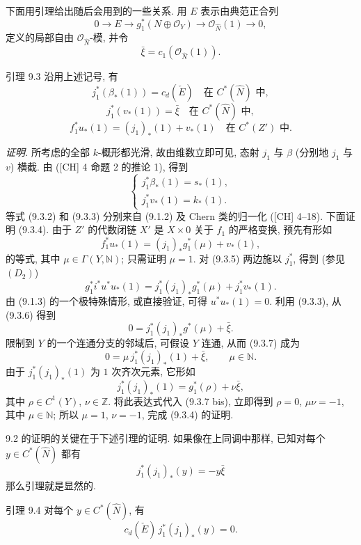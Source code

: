下面用引理给出随后会用到的一些关系. 用 $E$ 表示由典范正合列
\[
0\to E\to g_1^*(N\oplus\mathcal O_Y)\to\mathcal O_{\widehat N}(1)\to0,
\tag{9.3.0}
\]
定义的局部自由 $\mathcal O_{\widehat N}$-模, 并令
\[
\bar\xi=c_1(\mathcal O_{\widehat N}(1)).
\tag{9.3.1}
\]

\begin{statement}{引理 9.3}
沿用上述记号, 有
\[
j_1^*(\beta_*(1))=c_d(\check E)\quad\text{在 }C^*(\widehat N)\text{ 中},
\tag{9.3.2}
\]
\[
j_1^*(v_*(1))=\bar\xi\quad\text{在 }C^*(\widehat N)\text{ 中},
\tag{9.3.3}
\]
\[
f_1^*u_*(1)=(j_1)_*(1)+v_*(1)\quad\text{在 }C^*(Z')\text{ 中}.
\tag{9.3.4}
\]
\end{statement}

\emph{证明.} 所考虑的全部 $k$-概形都光滑, 故由维数立即可见, 态射 $j_1$ 与 $\beta$ (分别地 $j_1$ 与 $v$) 横截. 由 ([CH] 4 命题 2 的推论 1), 得到
\[
\begin{cases}
j_1^*\beta_*(1)=s_*(1),\\
j_1^*v_*(1)=k_*(1).
\end{cases}
\]
等式 (9.3.2) 和 (9.3.3) 分别来自 (9.1.2) 及 Chern 类的归一化 ([CH] 4--18). 下面证明 (9.3.4). 由于 $Z'$ 的代数闭链 $X'$ 是 $X\times0$ 关于 $f_1$ 的严格变换, 预先有形如
\[
f_1^*u_*(1)=(j_1)_*g_1^*(\mu)+v_*(1),
\tag{9.3.5}
\]
的等式, 其中 $\mu\in\Gamma(Y,\mathbb N)$; 只需证明 $\mu=1$. 对 (9.3.5) 两边施以 $j_1^*$, 得到 (参见 $(D_2)$)
\[
g_1^*i^*u^*u_*(1)=j_1^*(j_1)_*g_1^*(\mu)+j_1^*v_*(1).
\tag{9.3.6}
\]
由 (9.1.3) 的一个极特殊情形, 或直接验证, 可得 $u^*u_*(1)=0$. 利用 (9.3.3), 从 (9.3.6) 得到
\[
0=j_1^*(j_1)_*g^*(\mu)+\bar\xi.
\tag{9.3.7}
\]
限制到 $Y$ 的一个连通分支的邻域后, 可假设 $Y$ 连通, 从而 (9.3.7) 成为
\[
0=\mu\,j_1^*(j_1)_*(1)+\bar\xi,\qquad \mu\in\mathbb N.
\tag{9.3.7 bis}
\]
由于 $j_1^*(j_1)_*(1)$ 为 $1$ 次齐次元素, 它形如
\[
j_1^*(j_1)_*(1)=g_1^*(\rho)+\nu\bar\xi,
\]
其中 $\rho\in C^1(Y)$, $\nu\in\mathbb Z$. 将此表达式代入 (9.3.7 bis), 立即得到 $\rho=0$, $\mu\nu=-1$, 其中 $\mu\in\mathbb N$; 所以 $\mu=1$, $\nu=-1$, 完成 (9.3.4) 的证明.

9.2 的证明的关键在于下述引理的证明. 如果像在上同调中那样, 已知对每个 $y\in C^*(\widehat N)$ 都有
\[
j_1^*(j_1)_*(y)=-y\bar\xi
\]
那么引理就是显然的.

\begin{statement}{引理 9.4}
对每个 $y\in C^*(\widehat N)$, 有
\[
c_d(\check E)\,j_1^*(j_1)_*(y)=0.
\]
\end{statement}


